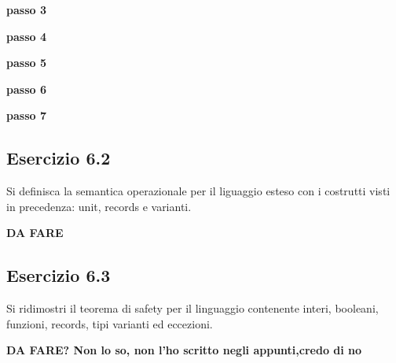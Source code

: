 \textbf{passo 3} 
\begin{prooftree} 
\end{prooftree}

\textbf{passo 4} 
\begin{prooftree}  
\end{prooftree}

\textbf{passo 5} 
\begin{prooftree}   
\end{prooftree}

\textbf{passo 6} 
\begin{prooftree}   
\end{prooftree}

\textbf{passo 7} 
\begin{prooftree}   
\end{prooftree}















\subsection*{Esercizio 6.2}
Si definisca la semantica operazionale per il liguaggio esteso con i costrutti visti in precedenza: unit, records e varianti.


\textbf{{\color{red} DA FARE}}


\subsection*{Esercizio 6.3}
Si ridimostri il teorema di safety per il linguaggio contenente interi, booleani, funzioni, records, tipi varianti ed eccezioni.

\textbf{{\color{red} DA FARE? Non lo so, non l'ho scritto negli appunti,credo di no}}